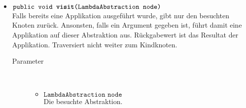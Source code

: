 \begin{description}
\begin{itemize}
		\item $\texttt{public void \textbf{visit}(LambdaAbstraction node)}$ \\ Falls bereits eine Applikation ausgeführt wurde, gibt nur den besuchten Knoten zurück. Ansonsten, falls ein Argument gegeben ist, führt damit eine Applikation auf dieser Abstraktion aus. Rückgabewert ist das Resultat der Applikation. Traversiert nicht weiter zum Kindknoten.
		\begin{description}
			\item[Parameter] \hfill \\
			\vspace{-.8cm}
			\begin{itemize}
				\item $\texttt{LambdaAbstraction node}$ \\ Die besuchte Abstraktion.
			\end{itemize}
		\end{description}
	\end{itemize}
\end{description}
